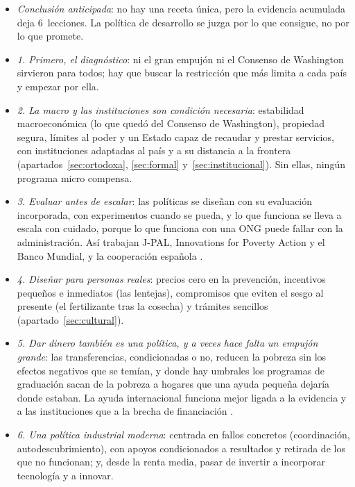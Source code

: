 \documentclass[11pt]{article}
\begin{document}
\begin{itemize}
\item \emph{Conclusión anticipada}: no hay una receta única, pero la evidencia acumulada deja 6~lecciones. La política de desarrollo se juzga por lo que consigue, no por lo que promete.
\item \emph{1. Primero, el diagnóstico}: ni el gran empujón ni el Consenso de Washington sirvieron para todos; hay que buscar la restricción que más limita a cada país y empezar por ella\nocite{HausmannRodrikVelasco2008}.
\item \emph{2. La macro y las instituciones son condición necesaria}: estabilidad macroeconómica (lo que quedó del Consenso de Washington), propiedad segura, límites al poder y un Estado capaz de recaudar y prestar servicios, con instituciones adaptadas al país y a su distancia a la frontera (apartados~\ref{sec:ortodoxa}, \ref{sec:formal} y~\ref{sec:institucional}). Sin ellas, ningún programa micro compensa.
\item \emph{3. Evaluar antes de escalar}: las políticas se diseñan con su evaluación incorporada, con experimentos cuando se pueda, y lo que funciona se lleva a escala con cuidado, porque lo que funciona con una ONG puede fallar con la administración\nocite{BanerjeeEtAl2017}. Así trabajan J-PAL, Innovations for Poverty Action y el Banco Mundial, y la cooperación española  .
\item \emph{4. Diseñar para personas reales}: precios cero en la prevención, incentivos pequeños e inmediatos (las lentejas), compromisos que eviten el sesgo al presente (el fertilizante tras la cosecha) y trámites sencillos (apartado~\ref{sec:cultural}).
\item \emph{5. Dar dinero también es una política, y a veces hace falta un empujón grande}: las transferencias, condicionadas o no, reducen la pobreza sin los efectos negativos que se temían, y donde hay umbrales los programas de graduación sacan de la pobreza a hogares que una ayuda pequeña dejaría donde estaban\nocite{BalboniEtAl2022}. La ayuda internacional funciona mejor ligada a la evidencia y a las instituciones que a la brecha de financiación   .
\item \emph{6. Una política industrial moderna}: centrada en fallos concretos (coordinación, autodescubrimiento), con apoyos condicionados a resultados y retirada de los que no funcionan\nocite{JuhaszLaneRodrik2024}; y, desde la renta media, pasar de invertir a incorporar tecnología y a innovar\nocite{BM2024Informe}.

\end{itemize}
\end{document}

